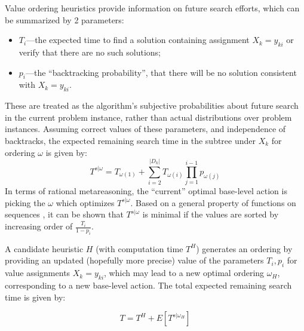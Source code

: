 Value ordering heuristics provide information on future search
efforts, which can be summarized by 2 parameters:
\begin{itemize}
\item  $T_i$---the expected time to find a solution containing
  assignment  $X_k=y_{ki}$ or verify that there are no such solutions;
\item  $p_i$---the ``backtracking probability'', that there will be no solution
consistent with $X_k=y_{ki}$.
\end{itemize}
These are treated as the algorithm's subjective probabilities about future search
in the current problem instance, rather than actual distributions over problem instances.
Assuming correct values of these parameters, and independence of backtracks,
the expected remaining search time in the subtree under $X_k$ for ordering $\omega$ is given by:
\begin{equation}
\label{eq:expected-search-time}
T^{s|\omega}=T_{\omega(1)}+\sum_{i=2}^{|D_k|}T_{\omega(i)}\prod_{j=1}^{i-1}p_{\omega(j)}
\end{equation}
In terms of rational metareasoning, the ``current'' optimal base-level action is picking
the $\omega $ which optimizes $T^{s|\omega}$.
Based on a general property of functions on sequences \cite{MonmaSidney.sequencing}, it can
be shown that $T^{s|\omega}$ is minimal if 
the values are sorted  by increasing order of $\frac {T_i} {1-p_i}$.

A candidate heuristic $H$ (with computation time $T^H$)  generates
an ordering by providing an updated (hopefully more precise)
value of the parameters $T_i, p_i$ for value assignments
$X_k=y_{ki}$, which may lead to a new optimal ordering $\omega_H$,
corresponding to a new base-level action.  The total expected
remaining search time is given by:

\begin{equation}
\label{eq:net-expected-time}
T=T^H+E[T^{s|\omega_H}]
\end{equation}

